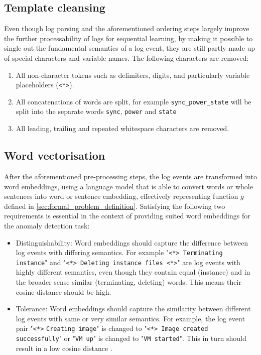 \subsection{Template cleansing \label{template_cleansing}}
Even though log parsing and the aforementioned ordering steps largely improve the further processability of logs for sequential learning, by making it possible to single out the fundamental semantics of a log event, they are still partly made up of special characters and variable names. The following characters are removed:
\begin{enumerate}
	\item All non-character tokens such as delimiters, digits, and particularly variable placeholders (\verb!<*>!).
	\item All concatenations of words are split, for example \verb!sync_power_state! will be split into the separate words \verb!sync!, \verb!power! and \verb!state!
	\item All leading, trailing and repeated whitespace characters are removed.
\end{enumerate}

\subsection{Word vectorisation \label{sec:word_vectorization}}
After the aforementioned pre-processing steps, the log events are transformed into word embeddings, using a language model that is able to convert words or whole sentences into word or sentence embedding, effectively representing function $g$ defined in \ref{sec:formal_problem_definition}. Satisfying the following two requirements is essential in the context of providing suited word embeddings for the anomaly detection task:
\begin{itemize}
	\item Distinguishability: Word embeddings should capture the difference between log events with differing semantics. For example "\verb!<*> Terminating instance!" and "\verb!<*> Deleting instance files <*>!" are log events with highly different semantics, even though they contain equal (instance) and in the broader sense similar (terminating, deleting) words. This means their cosine distance should be high.
	\item Tolerance: Word embeddings should capture the similarity between different log events with same or very similar semantics. For example, the log event pair "\verb!<*>! \verb!Creating image!" is changed to "\verb!<*> Image created successfully!" or "\verb!VM up!" is changed to "\verb!VM started!". This in turn should result in a low cosine distance \cite{zhang2019robust}.
\end{itemize}

